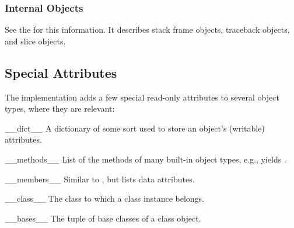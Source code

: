 \subsubsection{Internal Objects \label{typesinternal}}

See the  for this
information.  It describes stack frame objects, traceback objects, and
slice objects.


\subsection{Special Attributes \label{specialattrs}}

The implementation adds a few special read-only attributes to several
object types, where they are relevant:

\begin{memberdescni}{__dict__}
A dictionary of some sort used to store an
object's (writable) attributes.
\end{memberdescni}

\begin{memberdescni}{__methods__}
List of the methods of many built-in object types,
e.g.,  yields
.
\end{memberdescni}

\begin{memberdescni}{__members__}
Similar to , but lists data attributes.
\end{memberdescni}

\begin{memberdescni}{__class__}
The class to which a class instance belongs.
\end{memberdescni}

\begin{memberdescni}{__bases__}
The tuple of base classes of a class object.
\end{memberdescni}
